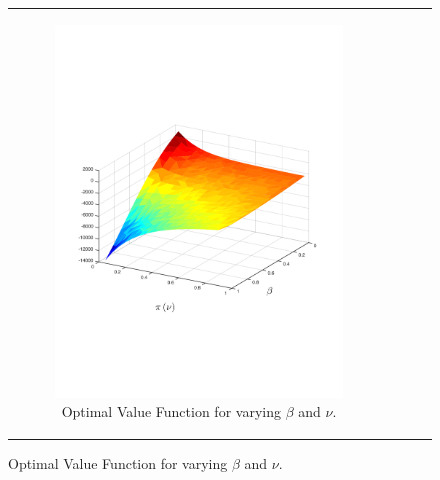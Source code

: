 {\begin{figure}[ht]
\begin{tabular}{cccc}
            \begin{subfigure}{0.24\textwidth}\centering\includegraphics[width=1.0\linewidth]{images/sir_vf_new}\caption{Optimal Value Function for varying {\footnotesize $ \beta $} and {\footnotesize $ \nu $}.}\label{fig:sir_vf}\end{subfigure}&

\end{tabular}
\end{figure}}
